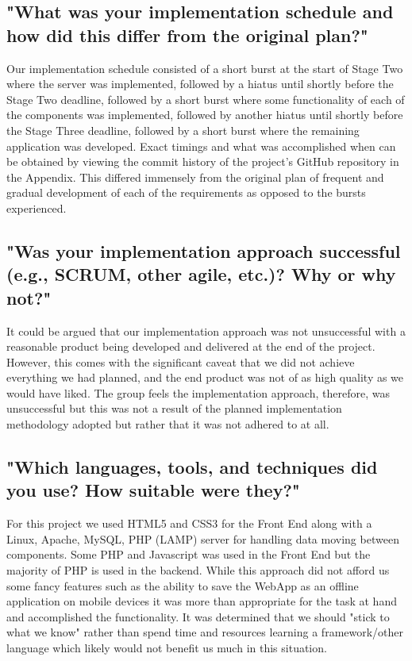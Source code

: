 \documentclass[11pt, oneside, a4paper]{report}   %
\begin{document}
\subsection{"What was your implementation schedule and how did this differ from the original plan?"} \label{sec:Implementation - 1}
Our implementation schedule consisted of a short burst at the start of Stage Two where the server was implemented, followed by a hiatus until shortly before the Stage Two deadline, followed by a short burst where some 
functionality of each of the components was implemented, followed by another hiatus until shortly before the Stage Three deadline, followed by a short burst where the remaining application was developed. Exact timings 
and what was accomplished when can be obtained by viewing the commit history of the project's GitHub repository in the Appendix. This differed immensely from the original plan of frequent and gradual development of
each of the requirements as opposed to the bursts experienced. 
\subsection{"Was your implementation approach successful (e.g., SCRUM, other agile, etc.)? Why or why
not?"} \label{sec:Implementation - 2}
It could be argued that our implementation approach was not unsuccessful with a reasonable product being developed and delivered at the end of the project. However, this comes with the significant caveat that we did not 
achieve everything we had planned, and the end product was not of as high quality as we would have liked. The group feels the implementation approach, therefore, was unsuccessful but this was not a result of the planned 
implementation methodology adopted but rather that it was not adhered to at all.  
\subsection{"Which languages, tools, and techniques did you use? How suitable were they?"} \label{sec:Implementation - 3}
For this project we used HTML5 and CSS3 for the Front End along with a Linux, Apache, MySQL, PHP (LAMP) server for handling data moving between components. Some PHP and Javascript was used in the Front End but the majority of PHP is used in the backend. While this approach did not afford us some fancy features such as the ability to save the WebApp as an offline application on mobile devices it was more than appropriate for the task at hand and accomplished the functionality. It was determined that we should "stick to what we know" rather than spend time and resources learning a framework/other language which likely would not benefit us much in this situation.
\pagebreak
\end{document}
